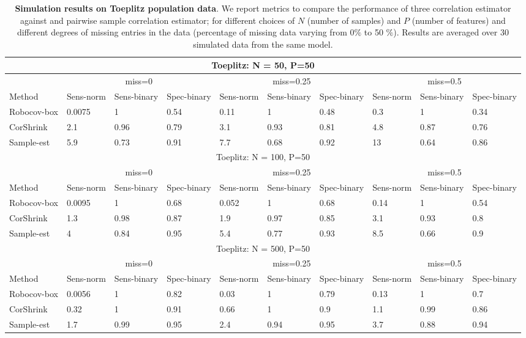 \begin{longtable}[c]{|p{3cm}||p{1.5cm}|p{1.0cm}|p{1.0cm}|p{1.0cm}|p{1.0cm}|p{1.0cm}|p{1.0cm}|p{1.0cm}|p{1.0cm}|}
\caption{\textbf{Simulation results on Toeplitz population data}. We report metrics to compare the performance of three \Robocov{} correlation estimator against \CorShrink{} and pairwise sample correlation estimator; for different choices of $N$ (number of samples) and $P$ (number of features) and different degrees of missing entries in the data (percentage of missing data varying from 0$\%$ to 50 $\%$). Results are averaged over 30 simulated data from the same model.}
\label{tab:simulation_toeplitz} \\ \hline
\multicolumn{10}{|c|}{Toeplitz: N = 50, P=50} \\ \hline
 & \multicolumn{3}{c|}{miss=0} & \multicolumn{3}{c|}{miss=0.25} & \multicolumn{3}{c|}{miss=0.5} \\ \hline
Method & Sens-norm & Sens-binary & Spec-binary &  Sens-norm & Sens-binary & Spec-binary &  Sens-norm & Sens-binary & Spec-binary \\ \hline 
Robocov-box & 0.0075 &   1 & 0.54 & 0.11 &   1 & 0.48 & 0.3 &   1 & 0.34 \\
CorShrink & 2.1 & 0.96 & 0.79 & 3.1 & 0.93 & 0.81 & 4.8 & 0.87 & 0.76 \\
Sample-est & 5.9 & 0.73 & 0.91  & 7.7 & 0.68 & 0.92 &  13 & 0.64 & 0.86\\ \hline
\multicolumn{10}{|c|}{Toeplitz: N = 100, P=50} \\ \hline
 & \multicolumn{3}{c|}{miss=0} & \multicolumn{3}{c|}{miss=0.25} & \multicolumn{3}{c|}{miss=0.5} \\ \hline
Method & Sens-norm & Sens-binary & Spec-binary &  Sens-norm & Sens-binary & Spec-binary &  Sens-norm & Sens-binary & Spec-binary \\ \hline 
Robocov-box & 0.0095 &   1 & 0.68 & 0.052 &   1 & 0.68 & 0.14 &   1 & 0.54  \\
CorShrink & 1.3 & 0.98 & 0.87 & 1.9 & 0.97 & 0.85 & 3.1 & 0.93 & 0.8 \\
Sample-est &   4 & 0.84 & 0.95 & 5.4 & 0.77 & 0.93 & 8.5 & 0.66 & 0.9 \\ \hline 
\multicolumn{10}{|c|}{Toeplitz: N = 500, P=50} \\ \hline
 & \multicolumn{3}{c|}{miss=0} & \multicolumn{3}{c|}{miss=0.25} & \multicolumn{3}{c|}{miss=0.5} \\ \hline
Method & Sens-norm & Sens-binary & Spec-binary &  Sens-norm & Sens-binary & Spec-binary &  Sens-norm & Sens-binary & Spec-binary \\ \hline 
Robocov-box  & 0.0056 &   1 & 0.82 & 0.03 &   1 & 0.79 & 0.13 &   1 & 0.7\\
CorShrink & 0.32 &   1 & 0.91 & 0.66 &   1 & 0.9 & 1.1 & 0.99 & 0.86 \\
Sample-est & 1.7 & 0.99 & 0.95 & 2.4 & 0.94 & 0.95 & 3.7 & 0.88 & 0.94 \\ \hline 
\end{longtable}